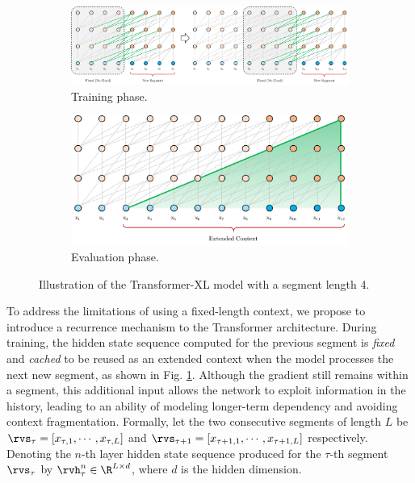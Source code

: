\begin{figure}[!h]
	\begin{subfigure}[b]{0.62\linewidth}
		\includegraphics[width=\textwidth]{FIG/xl-train.pdf}
		\caption{\small Training phase.}
		\label{fig:xl-train}
	\end{subfigure}
	\begin{subfigure}[b]{0.35\linewidth}
		\includegraphics[width=\textwidth]{FIG/xl-eval.pdf}
		\caption{\small Evaluation phase.}
		\label{fig:xl-eval}
	\end{subfigure}
	\caption{\small Illustration of the Transformer-XL model with a segment length 4.}
	\label{fig:xl}
\vspace{-1em}
\end{figure}
To address the limitations of using a fixed-length context, we propose to introduce a recurrence mechanism to the Transformer architecture.
During training, the hidden state sequence computed for the previous segment is \textit{fixed} and \textit{cached} to be reused as an extended context when the model processes the next new segment, as shown in Fig. \ref{fig:xl-train}.
Although the gradient still remains within a segment, this additional input allows the network to exploit information in the history, leading to an ability of modeling longer-term dependency and avoiding context fragmentation.
Formally, let the two consecutive segments of length $L$ be $\rvs_{\tau} = \left[x_{\tau,1}, \cdots, x_{\tau,L}\right]$ and $\rvs_{\tau+1} = \left[x_{\tau+1,1}, \cdots, x_{\tau+1,L}\right]$ respectively.
Denoting the $n$-th layer hidden state sequence produced for the $\tau$-th segment $\rvs_{\tau}$ by $\rvh_{\tau}^{n} \in \R^{L \times d}$, where $d$ is the hidden dimension.
